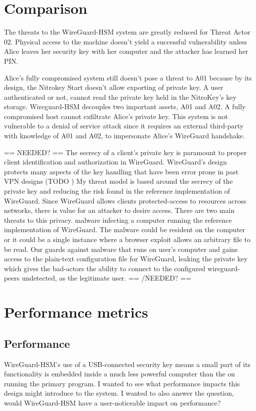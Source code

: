 \documentclass [11pt, proquest] {uwthesis}[2020/02/24]
\begin{document}
\section{Comparison}
The threats to the WireGuard-HSM system are greatly reduced for Threat Actor 02. Physical access to the machine doesn't yield a successful vulnerability unless Alice leaves her security key with her computer and the attacker has learned her PIN.

Alice's fully compromised system still doesn't pose a threat to A01 because by its design, the Nitrokey Start doesn't allow exporting of private key. A user authenticated or not, cannot read the private key held in the NitroKey's key storage.
Wireguard-HSM decouples two important assets, A01 and A02. A fully compromised host cannot exfiltrate Alice's private key. This system is not vulnerable to a denial of service attack since it requires an external third-party with knowledge of A01 and A02, to impersonate Alice's WireGuard handshake.



== NEEDED? ==
The secrecy of a client's private key is paramount to proper client identification and authorization in WireGuard. WireGuard's design protects many aspects of the key handling that have been error prone in past VPN designs (TODO )
My threat model is based around the secrecy of the private key and reducing the risk found in the reference implementation of WireGuard. Since WireGuard allows clients protected-access to resources across networks, there is value for an attacker to desire access. 
There are two main threats to this privacy.  malware infecting a computer running the reference implementation of WireGuard. The malware could be resident on the computer or it could be a single instance where a browser exploit allows an arbitrary file to be read. Our guards against malware that runs on user's computer and gains access to the plain-text configuration file for WireGuard, leaking the private key which gives the bad-actors the ability to connect to the configured wireguard-peers undetected, as the legitimate user.
== /NEEDED? ==



\section{Performance metrics}

\subsection{Performance}
WireGuard-HSM's use of a USB-connected security key means a small part of its functionality is embedded inside a much less powerful computer than the on running the primary program. I wanted to see what performance impacts this design might introduce to the system. I wanted to also answer the question, would WireGuard-HSM have a user-noticeable impact on performance?
\end{document}
